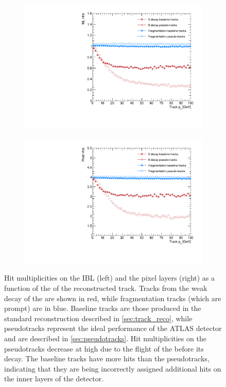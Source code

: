 \begin{figure}[!htbp]
  \centering
  \begin{subfigure}{.48\textwidth}
    \centering
    \includegraphics[width=\textwidth]{chapters/3.tracking/figs/overlay_po_nHitsOnIBL_From_B_pT.pdf}
  \end{subfigure}%
  \begin{subfigure}{.48\textwidth}
    \centering
    \includegraphics[width=\textwidth]{chapters/3.tracking/figs/overlay_po_nHitsOnPix_From_B_pT.pdf}
  \end{subfigure}
  \caption{
    Hit multiplicities on the IBL (left) and the pixel layers (right) as a function of the \pT of the reconstructed track.
    Tracks from the weak decay of the \bhadron are shown in red, while fragmentation tracks (which are prompt) are in blue.
    Baseline tracks are those produced in the standard reconstruction described in \cref{sec:track_reco}, while pseudotracks represent the ideal performance of the ATLAS detector and are described in \cref{sec:pseudotracks}.
    Hit multiplicities on the pseudotracks decrease at high \pt due to the flight of the \bhadron before its decay. 
    The baseline tracks have more hits than the pseudotracks, indicating that they are being incorrectly assigned additional hits on the inner layers of the detector.
  }
  \label{fig:pseudo_pix_hits}
\end{figure}

